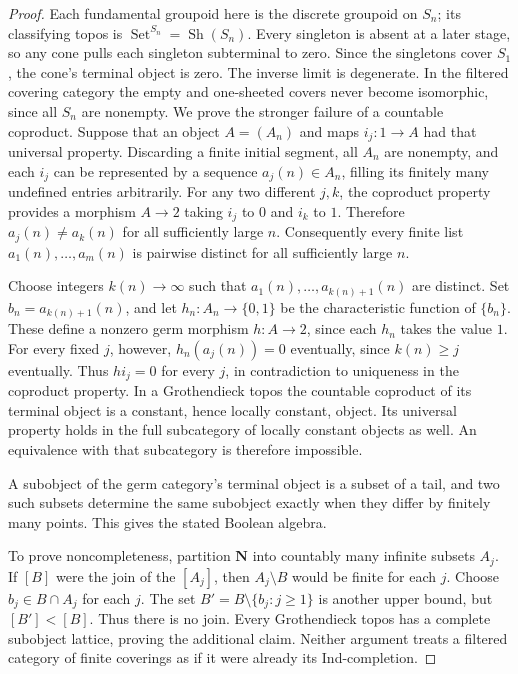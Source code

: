 \begin{proof}
Each fundamental groupoid here is the discrete groupoid on $S_n$;
its classifying topos is $\operatorname{Set}^{S_n}=
\operatorname{Sh}(S_n)$. Every singleton is absent at a later stage,
so any cone pulls each singleton subterminal to zero. Since the
singletons cover $S_1$, the cone's terminal object is zero. The inverse
limit is degenerate. In the filtered covering category the empty and
one-sheeted covers never become isomorphic, since all $S_n$ are
nonempty. We prove the stronger failure of a countable coproduct.
Suppose that an object $A=(A_n)$ and maps $i_j:1\to A$ had that
universal property. Discarding a finite initial segment, all $A_n$
are nonempty, and each $i_j$ can be represented by a sequence
$a_j(n)\in A_n$, filling its finitely many undefined entries
arbitrarily. For any two different $j,k$, the coproduct property
provides a morphism $A\to2$ taking $i_j$ to $0$ and $i_k$ to $1$.
Therefore $a_j(n)\ne a_k(n)$ for all sufficiently large $n$.
Consequently every finite list $a_1(n),\ldots,a_m(n)$ is pairwise
distinct for all sufficiently large $n$.

Choose integers $k(n)\to\infty$ such that
$a_1(n),\ldots,a_{k(n)+1}(n)$ are distinct. Set
$b_n=a_{k(n)+1}(n)$, and let $h_n:A_n\to\{0,1\}$ be the
characteristic function of $\{b_n\}$. These define a nonzero
germ morphism $h:A\to2$, since each $h_n$ takes the value $1$.
For every fixed $j$, however, $h_n(a_j(n))=0$ eventually, since
$k(n)\geq j$ eventually. Thus $hi_j=0$ for every $j$, in
contradiction to uniqueness in the coproduct property. In a
Grothendieck topos the countable coproduct of its terminal object
is a constant, hence locally constant, object. Its universal
property holds in the full subcategory of locally constant
objects as well. An equivalence with that subcategory is therefore
impossible.

A subobject of the germ category's terminal object is a subset of a tail,
and two such subsets determine the same subobject exactly when they
differ by finitely many points. This gives the stated Boolean algebra.

To prove noncompleteness, partition $\mathbf N$ into countably many
infinite subsets $A_j$. If $[B]$ were the join of the $[A_j]$, then
$A_j\setminus B$ would be finite for each $j$. Choose
$b_j\in B\cap A_j$ for each $j$. The set
$B'=B\setminus\{b_j:j\geq1\}$ is another upper bound, but
$[B']<[B]$. Thus there is no join. Every Grothendieck topos has a
complete subobject lattice, proving the additional claim. Neither
argument treats a filtered category of finite coverings as if it
were already its Ind-completion.
\end{proof}


